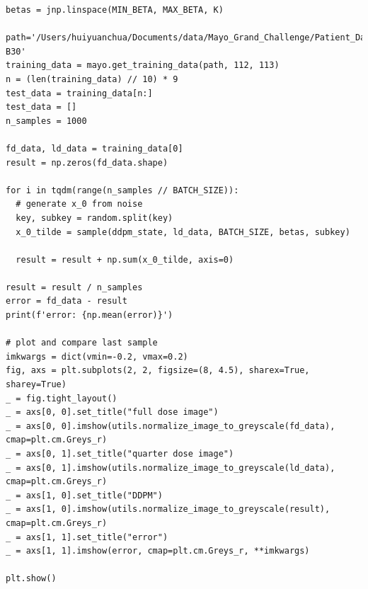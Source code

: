 \documentclass[a4paper, 11pt]{article}
\begin{document}
\begin{verbatim}
betas = jnp.linspace(MIN_BETA, MAX_BETA, K)

path='/Users/huiyuanchua/Documents/data/Mayo_Grand_Challenge/Patient_Data/Training_Image_Data/3mm B30'
training_data = mayo.get_training_data(path, 112, 113)
n = (len(training_data) // 10) * 9
test_data = training_data[n:]
test_data = []
n_samples = 1000

fd_data, ld_data = training_data[0]
result = np.zeros(fd_data.shape)

for i in tqdm(range(n_samples // BATCH_SIZE)):
  # generate x_0 from noise
  key, subkey = random.split(key)
  x_0_tilde = sample(ddpm_state, ld_data, BATCH_SIZE, betas, subkey)

  result = result + np.sum(x_0_tilde, axis=0)

result = result / n_samples
error = fd_data - result
print(f'error: {np.mean(error)}')

# plot and compare last sample
imkwargs = dict(vmin=-0.2, vmax=0.2)
fig, axs = plt.subplots(2, 2, figsize=(8, 4.5), sharex=True, sharey=True)
_ = fig.tight_layout()
_ = axs[0, 0].set_title("full dose image")
_ = axs[0, 0].imshow(utils.normalize_image_to_greyscale(fd_data), cmap=plt.cm.Greys_r)
_ = axs[0, 1].set_title("quarter dose image")
_ = axs[0, 1].imshow(utils.normalize_image_to_greyscale(ld_data), cmap=plt.cm.Greys_r)
_ = axs[1, 0].set_title("DDPM")
_ = axs[1, 0].imshow(utils.normalize_image_to_greyscale(result), cmap=plt.cm.Greys_r)
_ = axs[1, 1].set_title("error")
_ = axs[1, 1].imshow(error, cmap=plt.cm.Greys_r, **imkwargs)

plt.show()
\end{verbatim}
\end{document}
